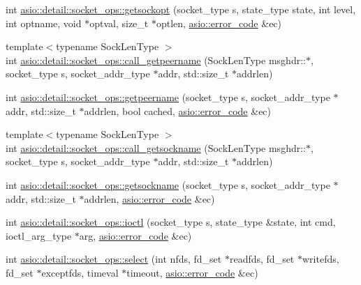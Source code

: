 \begin{DoxyCompactItemize}
\item 
int \hyperlink{namespaceasio_1_1detail_1_1socket__ops_a2f98481d00de572ace5ef4a983f892e1}{asio\+::detail\+::socket\+\_\+ops\+::getsockopt} (socket\+\_\+type s, state\+\_\+type state, int level, int optname, void $\ast$optval, size\+\_\+t $\ast$optlen, \hyperlink{classasio_1_1error__code}{asio\+::error\+\_\+code} \&ec)
\item 
{\footnotesize template$<$typename Sock\+Len\+Type $>$ }\\int \hyperlink{namespaceasio_1_1detail_1_1socket__ops_ad0ccca8eb7900ae75f969f2fff108595}{asio\+::detail\+::socket\+\_\+ops\+::call\+\_\+getpeername} (Sock\+Len\+Type msghdr\+::$\ast$, socket\+\_\+type s, socket\+\_\+addr\+\_\+type $\ast$addr, std\+::size\+\_\+t $\ast$addrlen)
\item 
int \hyperlink{namespaceasio_1_1detail_1_1socket__ops_a7eb8e3b97dad917c5fe4d3664c0ecf8f}{asio\+::detail\+::socket\+\_\+ops\+::getpeername} (socket\+\_\+type s, socket\+\_\+addr\+\_\+type $\ast$addr, std\+::size\+\_\+t $\ast$addrlen, bool cached, \hyperlink{classasio_1_1error__code}{asio\+::error\+\_\+code} \&ec)
\item 
{\footnotesize template$<$typename Sock\+Len\+Type $>$ }\\int \hyperlink{namespaceasio_1_1detail_1_1socket__ops_ae568252b745dce233ce0fbbdbc806f06}{asio\+::detail\+::socket\+\_\+ops\+::call\+\_\+getsockname} (Sock\+Len\+Type msghdr\+::$\ast$, socket\+\_\+type s, socket\+\_\+addr\+\_\+type $\ast$addr, std\+::size\+\_\+t $\ast$addrlen)
\item 
int \hyperlink{namespaceasio_1_1detail_1_1socket__ops_aeec0ef9b889b4b3ba39fe6648043a597}{asio\+::detail\+::socket\+\_\+ops\+::getsockname} (socket\+\_\+type s, socket\+\_\+addr\+\_\+type $\ast$addr, std\+::size\+\_\+t $\ast$addrlen, \hyperlink{classasio_1_1error__code}{asio\+::error\+\_\+code} \&ec)
\item 
int \hyperlink{namespaceasio_1_1detail_1_1socket__ops_ac3303fb771ae777eb12155ba979f05a4}{asio\+::detail\+::socket\+\_\+ops\+::ioctl} (socket\+\_\+type s, state\+\_\+type \&state, int cmd, ioctl\+\_\+arg\+\_\+type $\ast$arg, \hyperlink{classasio_1_1error__code}{asio\+::error\+\_\+code} \&ec)
\item 
int \hyperlink{namespaceasio_1_1detail_1_1socket__ops_a0a47a79366b24b2cf8cc7781f2ec82bc}{asio\+::detail\+::socket\+\_\+ops\+::select} (int nfds, fd\+\_\+set $\ast$readfds, fd\+\_\+set $\ast$writefds, fd\+\_\+set $\ast$exceptfds, timeval $\ast$timeout, \hyperlink{classasio_1_1error__code}{asio\+::error\+\_\+code} \&ec)

\end{DoxyCompactItemize}
